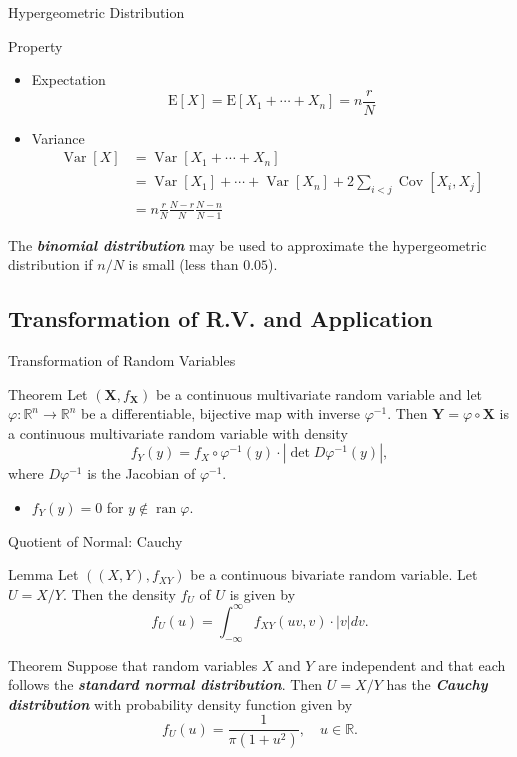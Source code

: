 \documentclass{beamer}
\newcommand{\bb}[1]{\textcolor{antiquefuchsia}{\textbf{\textit{#1}}}}
\begin{document}
\begin{frame}{Hypergeometric Distribution}
\begin{block}{Property}
\begin{itemize}
\item Expectation
$$
\mathrm{E}[X]=\mathrm{E}\left[X_{1}+\cdots+X_{n}\right]=n \frac{r}{N}
$$
\item Variance
$$
\begin{aligned}
\operatorname{Var}[X] &=\operatorname{Var}\left[X_{1}+\cdots+X_{n}\right] \\
&=\operatorname{Var}\left[X_{1}\right]+\cdots+\operatorname{Var}\left[X_{n}\right]+2 \sum_{i<j} \operatorname{Cov}\left[X_{i}, X_{j}\right] \\
&=n \frac{r}{N} \frac{N-r}{N} \frac{N-n}{N-1}
\end{aligned}
$$
\end{itemize}
The \bb{binomial distribution} may be used to approximate the hypergeometric distribution if $n / N$ is small (less than $0.05$).
\end{block}
\end{frame}

\subsection{Transformation of R.V. and Application}
\begin{frame}{Transformation of Random Variables}
\begin{block}{Theorem}
Let $\left(\boldsymbol{X}, f_{\boldsymbol{X}}\right)$ be a continuous multivariate random variable and let $\varphi: \mathbb{R}^{n} \rightarrow \mathbb{R}^{n}$ be a differentiable, bijective map with inverse $\varphi^{-1}$. Then $\boldsymbol{Y}=\varphi \circ \boldsymbol{X}$ is a continuous multivariate random variable with density
$$
f_{Y}(y)=f_{X} \circ \varphi^{-1}(y) \cdot\left|\operatorname{det} D \varphi^{-1}(y)\right|,
$$
where $D \varphi^{-1}$ is the Jacobian of $\varphi^{-1}$.
\end{block}
\begin{itemize}
\item $f_{Y}(y)=0$ for $y \notin \operatorname{ran} \varphi$.
\end{itemize}
\end{frame}

\begin{frame}{Quotient of Normal: Cauchy}
\begin{block}{Lemma}
Let $\left((X, Y), f_{X Y}\right)$ be a continuous bivariate random variable. Let $U=X / Y$. Then the density $f_{U}$ of $U$ is given by
$$
f_{U}(u)=\int_{-\infty}^{\infty} f_{X Y}(u v, v) \cdot|v| d v .
$$
\end{block}
\begin{block}{Theorem}
Suppose that random variables $X$ and $Y$ are independent and that each follows the \bb{standard normal distribution}. Then $U=X / Y$ has the \bb{Cauchy distribution} with probability density function given by
$$
f_{U}(u)=\frac{1}{\pi\left(1+u^{2}\right)}, \quad u \in \mathbb{R} .
$$
\end{block}
\end{frame}
\end{document}
